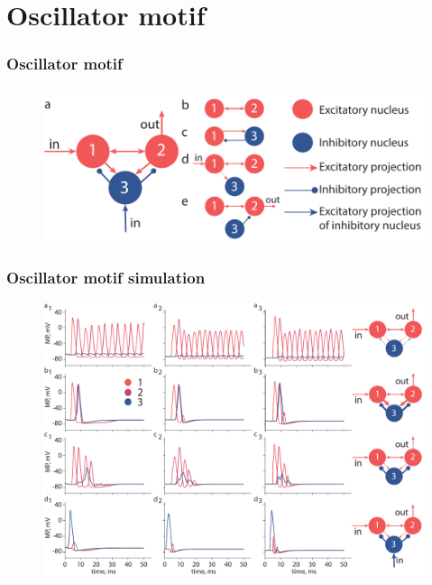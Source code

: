 \documentclass[12pt, aspectratio=169]{beamer}
\begin{document}
\section{Oscillator motif}
\begin{frame}
  \frametitle{Oscillator motif}
  \begin{figure}
    \includegraphics[width=0.8\linewidth]{OM}
  \end{figure}
\end{frame}
\begin{frame}
  \frametitle{Oscillator motif simulation}
  \begin{figure}
    \includegraphics[width=0.7\linewidth]{OM_sim}
  \end{figure}
\end{frame}
\end{document}
